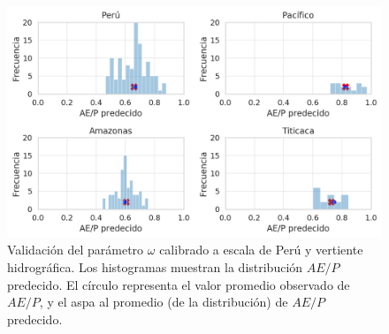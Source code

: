 \begin{figure}[htb]
	\includegraphics[scale=.78]{Images/09_proBK_val.png}
	\centering
	\caption{Validación del parámetro $\omega$ calibrado a escala de Perú y vertiente hidrográfica. Los histogramas muestran la distribución $AE/P$ predecido. El círculo representa el valor promedio observado de $AE/P$, y el aspa al promedio (de la distribución) de $AE/P$ predecido.}
	\label{fig:09_proBK_val}
\end{figure}
